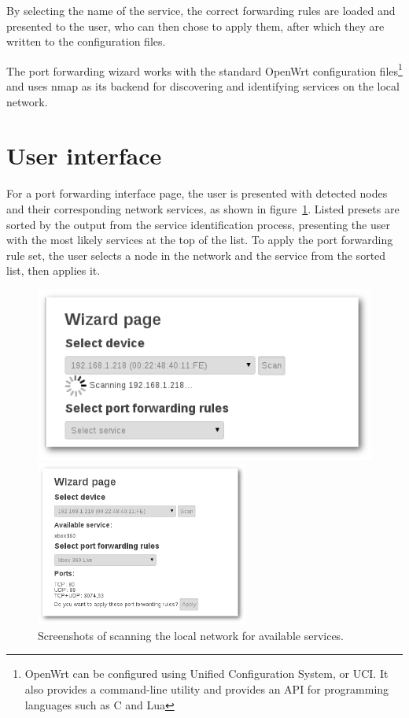 \documentclass[a4paper,11pt,makeidx]{kth-bcs}
\begin{document}
By selecting the name of the service, the correct forwarding rules are loaded and presented to the user, who can then chose to apply them, after which they are written to the configuration files.

The port forwarding wizard works with the standard OpenWrt configuration files\footnote{OpenWrt can be configured using Unified Configuration System, or UCI. It also provides a command-line utility and provides an API for programming languages such as C and Lua} and uses nmap as its backend for discovering and identifying services on the local network.

   \section{User interface}
For a port forwarding interface page, the user is presented with detected nodes and their corresponding network services, as shown in figure~\ref{fig:scanning}.
Listed presets are sorted by the output from the service identification process, presenting the user with the most likely services at the top of the list.
To apply the port forwarding rule set, the user selects a node in the network and the service from the sorted list, then applies it.


\begin{figure}[h]
   \begin{minipage}[b]{0.45\linewidth}
      \centering
      \includegraphics[width=\textwidth]{ss-scanning-shadow}
   \end{minipage}
   \hspace{0.5cm}
   \begin{minipage}[b]{0.45\linewidth}
      \centering
      \includegraphics[width=7cm]{ss-scanned-shadow}
   \end{minipage}
   \caption{Screenshots of scanning the local network for available services.}
   \label{fig:scanning}
\end{figure}
\end{document}
